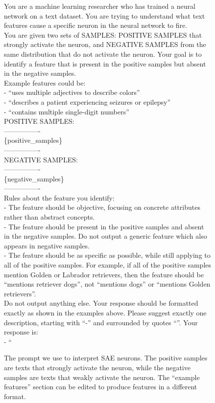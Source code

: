\begin{figure*}[!htb]
\centering\small
\begin{tcolorbox}[colback=blue!5!white, colframe=blue!75!black, boxrule=0.5mm, arc=4mm, boxsep=5pt, width=\textwidth]
You are a machine learning researcher who has trained a neural network on a text dataset. You are trying to understand what text features cause a specific neuron in the neural network to fire. \\

You are given two sets of SAMPLES: POSITIVE SAMPLES that strongly activate the neuron, and NEGATIVE SAMPLES from the same distribution that do not activate the neuron. Your goal is to identify a feature that is present in the positive samples but absent in the negative samples. \\
Example features could be: \\
- ``uses multiple adjectives to describe colors'' \\
- ``describes a patient experiencing seizures or epilepsy'' \\
- ``contains multiple single-digit numbers'' \\

POSITIVE SAMPLES: \\
---------------- \\
\{positive\_samples\} \\
---------------- \\

NEGATIVE SAMPLES: \\
---------------- \\
\{negative\_samples\} \\
---------------- \\

Rules about the feature you identify: \\
- The feature should be objective, focusing on concrete attributes rather than abstract concepts. \\
- The feature should be present in the positive samples and absent in the negative samples. Do not output a generic feature which also appears in negative samples. \\
- The feature should be as specific as possible, while still applying to all of the positive samples. For example, if all of the positive samples mention Golden or Labrador retrievers, then the feature should be ``mentions retriever dogs'', not ``mentions dogs'' or ``mentions Golden retrievers''. \\

Do not output anything else. Your response should be formatted exactly as shown in the examples above. Please suggest exactly one description, starting with ``-'' and surrounded by quotes ``''. Your response is: \\
- ``
\end{tcolorbox}
\caption{The prompt we use to interpret SAE neurons. 
The positive samples are texts that strongly activate the neuron, while the negative samples are texts that weakly activate the neuron. 
The ``example features'' section can be edited to produce features in a different format.
}
\label{fig:interp_prompt_binary}
\end{figure*}
